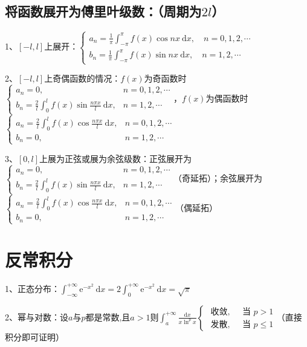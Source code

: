 \subsection{将函数展开为傅里叶级数：（周期为$ 2l $）}

1、$ [-l, l] $上展开：$ \left\{\begin{array}{l} a_{n}=\frac{1}{\pi} \int_{-\pi}^{\pi} f(x) \cos n x \mathrm{~d} x, \quad n=0,1,2, \cdots \\ b_{n}=\frac{1}{\pi} \int_{-\pi}^{\pi} f(x) \sin n x \mathrm{~d} x, \quad n=1,2, \cdots \end{array}\right. $

2、$ [-l, l] $上奇偶函数的情况：$ f(x) $为奇函数时$ \begin{cases}a_{n}=0, & n=0,1,2, \cdots \\ b_{n}=\frac{2}{l} \int_{0}^{l} f(x) \sin \frac{n \pi x}{l} \mathrm{~d} x, & n=1,2, \cdots\end{cases} $，$ f(x) $为偶函数时$ \begin{cases}a_{n}=\frac{2}{l} \int_{0}^{l} f(x) \cos \frac{n \pi x}{l} \mathrm{~d} x, & n=0,1,2, \cdots \\ b_{n}=0, & n=1,2, \cdots\end{cases} $

3、$ [0, l] $上展为正弦或展为余弦级数：正弦展开为$ \begin{cases}a_{n}=0, & n=0,1,2, \cdots \\ b_{n}=\frac{2}{l} \int_{0}^{l} f(x) \sin \frac{n \pi x}{l} \mathrm{~d} x, & n=1,2, \cdots\end{cases} $（奇延拓）；余弦展开为$ \begin{cases}a_{n}=\frac{2}{l} \int_{0}^{l} f(x) \cos \frac{n \pi x}{l} \mathrm{~d} x, & n=0,1,2, \cdots \\ b_{n}=0, & n=1,2, \cdots\end{cases} $（偶延拓）

\section{反常积分}

1、正态分布：$ \int_{-\infty}^{+\infty} \mathrm{e}^{-x^{2}} \mathrm{~d} x=2 \int_{0}^{+\infty} \mathrm{e}^{-x^{2}} \mathrm{~d} x=\sqrt{\pi} $

2、幂与对数：设$ a $与$ p $都是常数,且$ a>1 $则$ \int_{a}^{+\infty} \frac{\mathrm{d} x}{x \ln ^{p} x} \begin{cases}\text { 收敛, } & \text { 当 } p>1 \\ \text { 发散, } & \text { 当 } p \leqslant 1\end{cases} $（直接积分即可证明）

